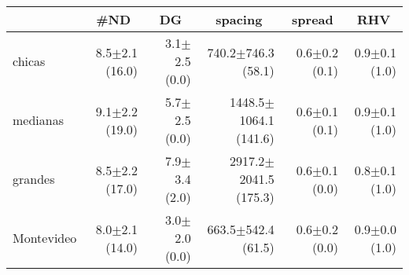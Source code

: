 \centering
\begin{adjustbox}{max width=1\textwidth}
\begin{footnotesize}
\begin{tabular}{lrrrrr}
\toprule
			&\multicolumn{1}{c}{\#ND}& \multicolumn{1}{c}{DG} & \multicolumn{1}{c}{spacing} & \multicolumn{1}{c}{spread} & \multicolumn{1}{c}{RHV} \\\midrule
 chicas     & 8.5$\pm$2.1 (16.0) & 3.1$\pm$2.5 (0.0) & 740.2$\pm$746.3 (58.1)    & 0.6$\pm$0.2 (0.1) & 0.9$\pm$0.1 (1.0) \\
 medianas   & 9.1$\pm$2.2 (19.0) & 5.7$\pm$2.5 (0.0) & 1448.5$\pm$1064.1 (141.6) & 0.6$\pm$0.1 (0.1) & 0.9$\pm$0.1 (1.0) \\
 grandes   & 8.5$\pm$2.2 (17.0) & 7.9$\pm$3.4 (2.0) & 2917.2$\pm$2041.5 (175.3) & 0.6$\pm$0.1 (0.0) & 0.8$\pm$0.1 (1.0) \\
 Montevideo & 8.0$\pm$2.1 (14.0) & 3.0$\pm$2.0 (0.0) & 663.5$\pm$542.4 (61.5)    & 0.6$\pm$0.2 (0.0) & 0.9$\pm$0.0 (1.0) \\
\bottomrule
\end{tabular}
\end{footnotesize}
\end{adjustbox}